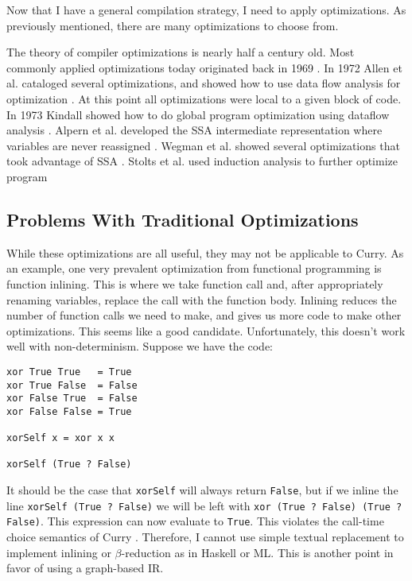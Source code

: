 Now that I have a general compilation strategy, I need to apply optimizations.
As previously mentioned, there are many optimizations to choose from.

The theory of compiler optimizations is nearly half a century old.
Most commonly applied optimizations today originated back in 1969 \cite{optminzation_allen}.
In 1972 Allen et al. cataloged several optimizations, and showed how to use data flow analysis for optimization \cite{dataflow_allen}.
At this point all optimizations were local to a given block of code.
In 1973 Kindall showed how to do global program optimization using dataflow analysis \cite{dataflow_kildall}.
Alpern et al. developed the SSA intermediate representation where variables are never reassigned \cite{ssa_alpern}.
Wegman et al. showed several optimizations that took advantage of SSA \cite{ssa_Wegman}.
Stolts et al. used induction analysis to further optimize program \cite{ssa_wolfe}

\subsection{Problems With Traditional Optimizations}
While these optimizations are all useful, they may not be applicable to Curry.
As an example, one very prevalent optimization from functional programming is function inlining.
This is where we take function call and, after appropriately renaming variables,
replace the call with the function body.
Inlining reduces the number of function calls we need to make, 
and gives us more code to make other optimizations.
This seems like a good candidate.
Unfortunately, this doesn't work well with non-determinism.
Suppose we have the code:
\begin{verbatim}
xor True True   = True
xor True False  = False
xor False True  = False
xor False False = True

xorSelf x = xor x x

xorSelf (True ? False)
\end{verbatim}
It should be the case that \texttt{xorSelf} will always return \texttt{False},
but if we inline the line \texttt{xorSelf (True ? False)} we will be left with \texttt{xor (True ? False) (True ? False)}.
This expression can now evaluate to \texttt{True}.
This violates the call-time choice semantics of Curry \cite{LopezFraguas14TPLP}.
Therefore, I cannot use simple textual replacement to implement inlining or $\beta$-reduction as in Haskell or ML.
This is another point in favor of using a graph-based IR.

